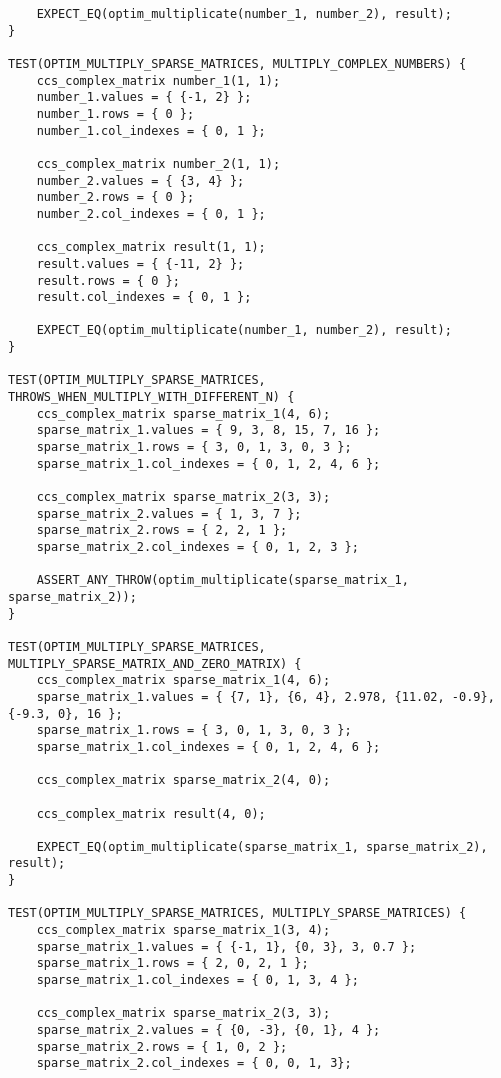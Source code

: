 \documentclass{report}
\begin{document}
\begin{itemize}
\begin{itemize}
\begin{lstlisting}
    EXPECT_EQ(optim_multiplicate(number_1, number_2), result);
}

TEST(OPTIM_MULTIPLY_SPARSE_MATRICES, MULTIPLY_COMPLEX_NUMBERS) {
    ccs_complex_matrix number_1(1, 1);
    number_1.values = { {-1, 2} };
    number_1.rows = { 0 };
    number_1.col_indexes = { 0, 1 };
    
    ccs_complex_matrix number_2(1, 1);
    number_2.values = { {3, 4} };
    number_2.rows = { 0 };
    number_2.col_indexes = { 0, 1 };
    
    ccs_complex_matrix result(1, 1);
    result.values = { {-11, 2} };
    result.rows = { 0 };
    result.col_indexes = { 0, 1 };

    EXPECT_EQ(optim_multiplicate(number_1, number_2), result);
}

TEST(OPTIM_MULTIPLY_SPARSE_MATRICES, THROWS_WHEN_MULTIPLY_WITH_DIFFERENT_N) {
    ccs_complex_matrix sparse_matrix_1(4, 6);
    sparse_matrix_1.values = { 9, 3, 8, 15, 7, 16 };
    sparse_matrix_1.rows = { 3, 0, 1, 3, 0, 3 };
    sparse_matrix_1.col_indexes = { 0, 1, 2, 4, 6 };
    
    ccs_complex_matrix sparse_matrix_2(3, 3);
    sparse_matrix_2.values = { 1, 3, 7 };
    sparse_matrix_2.rows = { 2, 2, 1 };
    sparse_matrix_2.col_indexes = { 0, 1, 2, 3 };
    
    ASSERT_ANY_THROW(optim_multiplicate(sparse_matrix_1, sparse_matrix_2));
}

TEST(OPTIM_MULTIPLY_SPARSE_MATRICES, MULTIPLY_SPARSE_MATRIX_AND_ZERO_MATRIX) {
    ccs_complex_matrix sparse_matrix_1(4, 6);
    sparse_matrix_1.values = { {7, 1}, {6, 4}, 2.978, {11.02, -0.9}, {-9.3, 0}, 16 };
    sparse_matrix_1.rows = { 3, 0, 1, 3, 0, 3 };
    sparse_matrix_1.col_indexes = { 0, 1, 2, 4, 6 };
    
    ccs_complex_matrix sparse_matrix_2(4, 0);
    
    ccs_complex_matrix result(4, 0);

    EXPECT_EQ(optim_multiplicate(sparse_matrix_1, sparse_matrix_2), result);
}

TEST(OPTIM_MULTIPLY_SPARSE_MATRICES, MULTIPLY_SPARSE_MATRICES) {
    ccs_complex_matrix sparse_matrix_1(3, 4);
    sparse_matrix_1.values = { {-1, 1}, {0, 3}, 3, 0.7 };
    sparse_matrix_1.rows = { 2, 0, 2, 1 };
    sparse_matrix_1.col_indexes = { 0, 1, 3, 4 };
    
    ccs_complex_matrix sparse_matrix_2(3, 3);
    sparse_matrix_2.values = { {0, -3}, {0, 1}, 4 };
    sparse_matrix_2.rows = { 1, 0, 2 };
    sparse_matrix_2.col_indexes = { 0, 0, 1, 3};
    

\end{lstlisting}
\end{itemize}
\end{itemize}
\end{document}

